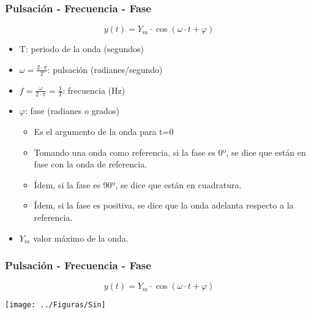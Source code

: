 \documentclass[serif, xcolor=dvipsnames]{beamer}
\begin{document}
\begin{frame}
  \frametitle{Pulsación - Frecuencia - Fase}

\[
y(t)=Y_{m}\cdot\cos(\omega\cdot t+\varphi)
\]

\begin{itemize}
\item T: periodo de la onda (segundos)
\item $\omega=\frac{2\cdot\pi}{T}$: pulsación (radianes/segundo)
\item $f=\frac{\omega}{2\cdot\pi}=\frac{1}{T}$: frecuencia (Hz)
\item $\varphi$: fase (radianes o grados)

  \begin{itemize}
  \item Es el argumento de la onda para t=0
  \item Tomando una onda como referencia, si la fase es 0º, se dice
    que están en fase con la onda de referencia.
  \item Ídem, si la fase es 90º, se dice que están en cuadratura.
  \item Ídem, si la fase es positiva, se dice que la onda adelanta
    respecto a la referencia.
  \end{itemize}
\item $Y_{m}$ valor máximo de la onda.
\end{itemize}

\end{frame}
\begin{frame}[plain]
  \frametitle{Pulsación - Frecuencia - Fase}

\[
y(t)=Y_{m}\cdot\cos(\omega\cdot t+\varphi)
\]


\begin{center}
  \texttt{[image: ../Figuras/Sin]}
  \par\end{center}


\end{frame}
\end{document}
